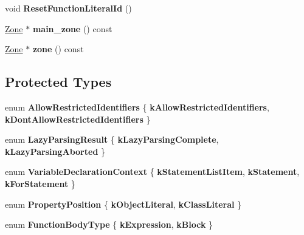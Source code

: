 \begin{DoxyCompactItemize}
\item 
\mbox{\label{classv8_1_1internal_1_1ParserBase_abdfba040cbdfdea121b363f129e30916}} 
void {\bfseries Reset\+Function\+Literal\+Id} ()
\item 
\mbox{\label{classv8_1_1internal_1_1ParserBase_a657040ae50d226a7510ba013700ac1cc}} 
\mbox{\hyperlink{classv8_1_1internal_1_1Zone}{Zone}} $\ast$ {\bfseries main\+\_\+zone} () const
\item 
\mbox{\label{classv8_1_1internal_1_1ParserBase_a41cc66772a4675457caf05f2cf4260b3}} 
\mbox{\hyperlink{classv8_1_1internal_1_1Zone}{Zone}} $\ast$ {\bfseries zone} () const
\end{DoxyCompactItemize}
\subsection*{Protected Types}
\begin{DoxyCompactItemize}
\item 
\mbox{\label{classv8_1_1internal_1_1ParserBase_abaaa5f38ca6d6f9809f6f1d236cee954}} 
enum {\bfseries Allow\+Restricted\+Identifiers} \{ {\bfseries k\+Allow\+Restricted\+Identifiers}, 
{\bfseries k\+Dont\+Allow\+Restricted\+Identifiers}
 \}
\item 
\mbox{\label{classv8_1_1internal_1_1ParserBase_a96ed993df1707db57757b5b6af25efa9}} 
enum {\bfseries Lazy\+Parsing\+Result} \{ {\bfseries k\+Lazy\+Parsing\+Complete}, 
{\bfseries k\+Lazy\+Parsing\+Aborted}
 \}
\item 
\mbox{\label{classv8_1_1internal_1_1ParserBase_a82baab97427f3ea183909b7877f54712}} 
enum {\bfseries Variable\+Declaration\+Context} \{ {\bfseries k\+Statement\+List\+Item}, 
{\bfseries k\+Statement}, 
{\bfseries k\+For\+Statement}
 \}
\item 
\mbox{\label{classv8_1_1internal_1_1ParserBase_a2d89b60bce3a5184a2628b4b2df7df67}} 
enum {\bfseries Property\+Position} \{ {\bfseries k\+Object\+Literal}, 
{\bfseries k\+Class\+Literal}
 \}
\item 
\mbox{\label{classv8_1_1internal_1_1ParserBase_ab8515be48cd8c2011b9364ec92f6e5cf}} 
enum {\bfseries Function\+Body\+Type} \{ {\bfseries k\+Expression}, 
{\bfseries k\+Block}
 \}
\end{DoxyCompactItemize}
